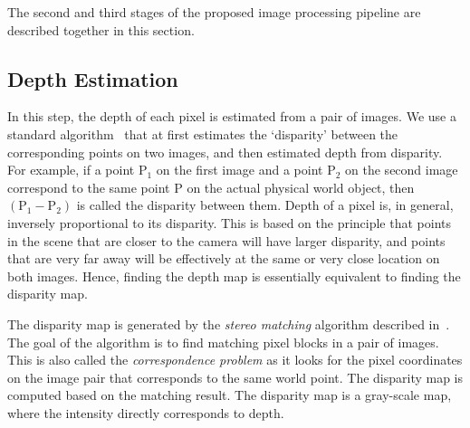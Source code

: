 The second and third stages of the proposed image processing pipeline are described together in this section.

\subsection{Depth Estimation}
\label{sec:algo_dep}

In this step, the depth of each pixel is estimated from a pair of images. We use a standard algorithm~\cite{hirschmuller2005accurate} that at first estimates the `disparity' between the corresponding points on two images, and then estimated depth from disparity. For example, if a point $\mathrm{P_1}$ on the first image and a point $\mathrm{P_2}$ on the second image correspond to the same point $\mathrm{P}$ on the actual physical world object, then $\mathrm{(P_1 - P_2)}$ is called the disparity between them. Depth of a pixel is, in general, inversely proportional to its disparity. This is based on the principle that points in the scene that are closer to the camera will have larger disparity, and points that are very far away will be effectively at the same or very close location on both images. Hence, finding the depth map is essentially equivalent to finding the disparity map.

The disparity map is generated by the \textit{stereo matching} algorithm described in~\cite{hirschmuller2005accurate}. The goal of the algorithm is to find matching pixel blocks in a pair of images. This is also called the \textit{correspondence problem} as it looks for the pixel coordinates on the image pair that corresponds to the same world point. The disparity map is computed based on the matching result. The disparity map is a gray-scale map, where the intensity directly corresponds to depth.



%



